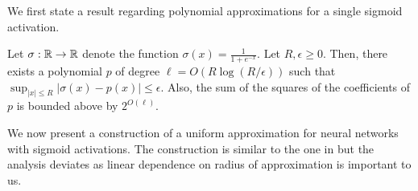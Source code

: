We first state a result regarding polynomial approximations for a single sigmoid activation. 

\begin{theorem}
\label{thm:sigmoid_poly}
Let $\sigma:\mathbb{R}\to \mathbb{R}$ denote the function $\sigma(x)=\frac{1}{1+e^{-x}}$. Let $R,\epsilon\geq 0$. Then, there exists a polynomial $p$ of degree $\ell=O(R\log(R/\epsilon))$ such that 
$\sup_{|x|\leq R}|\sigma(x)-p(x)|\leq \epsilon$. Also, the sum of the squares of the coefficients of $p$ is bounded above by $2^{O(\ell)}$.
\end{theorem}

We now present a construction of a uniform approximation for neural networks with sigmoid activations. The construction is similar to the one in \cite{reliable_goel2017} but the analysis deviates as linear dependence on radius of approximation is important to us.


